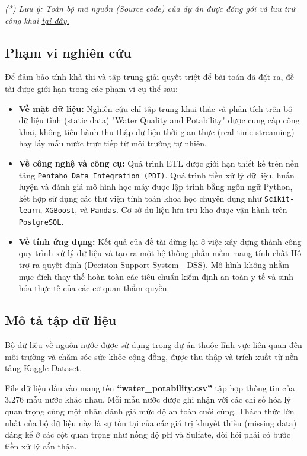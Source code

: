 \textit{(*) Lưu ý: Toàn bộ mã nguồn (Source code) của dự án được đóng gói và lưu trữ công khai \href{https://github.com/Shootingstar2608/data_warehouse_assignment}{\color{blue} tại đây.}}

\subsection{Phạm vi nghiên cứu}
\hspace{17pt}Để đảm bảo tính khả thi và tập trung giải quyết triệt để bài toán đã đặt ra, đề tài được giới hạn trong các phạm vi cụ thể sau:
\begin{itemize}
    \item \textbf{Về mặt dữ liệu:} Nghiên cứu chỉ tập trung khai thác và phân tích trên bộ dữ liệu tĩnh (static data) "Water Quality and Potability" được cung cấp công khai, không tiến hành thu thập dữ liệu thời gian thực (real-time streaming) hay lấy mẫu nước trực tiếp từ môi trường tự nhiên.
    \item \textbf{Về công nghệ và công cụ:} Quá trình ETL được giới hạn thiết kế trên nền tảng \texttt{Pentaho Data Integration (PDI)}. Quá trình tiền xử lý dữ liệu, huấn luyện và đánh giá mô hình học máy được lập trình bằng ngôn ngữ Python, kết hợp sử dụng các thư viện tính toán khoa học chuyên dụng như \texttt{Scikit-learn}, \texttt{XGBoost}, và \texttt{Pandas}. Cơ sở dữ liệu lưu trữ kho được vận hành trên \texttt{PostgreSQL}.
    \item \textbf{Về tính ứng dụng:} Kết quả của đề tài dừng lại ở việc xây dựng thành công quy trình xử lý dữ liệu và tạo ra một hệ thống phần mềm mang tính chất Hỗ trợ ra quyết định (Decision Support System - DSS). Mô hình không nhằm mục đích thay thế hoàn toàn các tiêu chuẩn kiểm định an toàn y tế và sinh hóa thực tế của các cơ quan thẩm quyền.
\end{itemize}

\subsection{Mô tả tập dữ liệu}
\hspace{17pt}Bộ dữ liệu về nguồn nước được sử dụng trong dự án thuộc lĩnh vực liên quan đến môi trường và chăm sóc sức khỏe cộng đồng, được thu thập và trích xuất từ nền tảng \href{https://www.kaggle.com/datasets/uom190346a/water-quality-and-potability}{\color{blue} Kaggle Dataset}. 

\hspace{17pt}File dữ liệu đầu vào mang tên \textbf{``water\_potability.csv''} tập hợp thông tin của 3.276 mẫu nước khác nhau. Mỗi mẫu nước được ghi nhận với các chỉ số hóa lý quan trọng cùng một nhãn đánh giá mức độ an toàn cuối cùng. Thách thức lớn nhất của bộ dữ liệu này là sự tồn tại của các giá trị khuyết thiếu (missing data) đáng kể ở các cột quan trọng như nồng độ pH và Sulfate, đòi hỏi phải có bước tiền xử lý cẩn thận.

